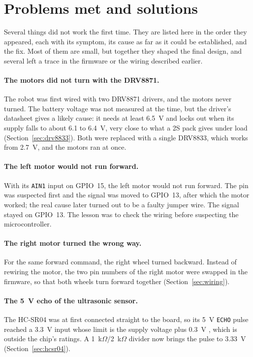 \section{Problems met and solutions}
\label{sec:problems}
Several things did not work the first time. They are listed here in the order they
appeared, each with its symptom, its cause as far as it could be established, and the fix. Most
of them are small, but together they shaped the final design, and several left a trace in
the firmware or the wiring described earlier.

\paragraph{The motors did not turn with the DRV8871.} The robot was first wired with two
DRV8871 drivers, and the motors never turned. The battery voltage was not measured at
the time, but the driver's datasheet gives a likely cause: it needs at least 6.5~V and
locks out when its supply falls to about 6.1 to 6.4~V, very close to what a 2S pack gives
under load (Section~\ref{sec:drv8833}). Both were replaced with a single DRV8833, which
works from 2.7~V, and the motors ran at once.

\paragraph{The left motor would not run forward.} With its \texttt{AIN1} input on
GPIO~15, the left motor would not run forward. The pin was suspected first and the
signal was moved to GPIO~13, after which the motor worked; the real cause later turned
out to be a faulty jumper wire. The signal stayed on GPIO~13. The lesson was to check the
wiring before suspecting the microcontroller.

\paragraph{The right motor turned the wrong way.} For the same forward command, the right
wheel turned backward. Instead of rewiring the motor, the two pin numbers of the right
motor were swapped in the firmware, so that both wheels turn forward together
(Section~\ref{sec:wiring}).

\paragraph{The 5~V echo of the ultrasonic sensor.} The HC-SR04 was at first connected
straight to the board, so its 5~V \texttt{ECHO} pulse reached a 3.3~V input whose limit
is the supply voltage plus 0.3~V \cite{esp32s3_datasheet}, which is outside the chip's
ratings. A 1~k\(\Omega\)/2~k\(\Omega\) divider now brings the pulse to 3.33~V
(Section~\ref{sec:hcsr04}).

